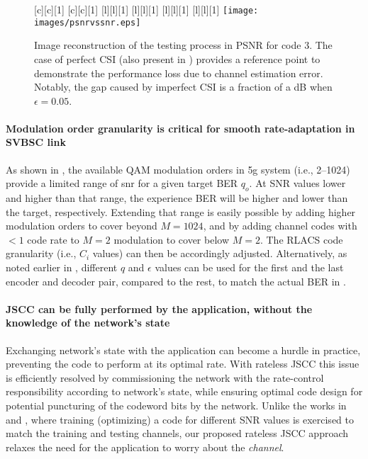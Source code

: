 \begin{figure}[t!]
\begin{center}
[c][c][1]{\scalebox{.8}{image reconstruction PSNR [dB]}}
[c][c][1]{\scalebox{.8}{channel signal to noise ratio [dB]}}
[l][l][1]{\scalebox{\textsizescale}{perfect CSI}}
[l][l][1]{\scalebox{\textsizescale}{imperfect CSI, $\epsilon = 0.01$}}
[l][l][1]{\scalebox{\textsizescale}{imperfect CSI, $\epsilon = 0.05$}}
[l][l][1]{\scalebox{\textsizescale}{imperfect CSI, $\epsilon = 0.1$} }
\texttt{[image: images/psnrvssnr.eps]}
\caption{Image reconstruction of the testing process in PSNR for code 3. The case of perfect CSI (also present in ) provides a reference point to demonstrate the performance loss due to channel estimation error. Notably, the gap caused by imperfect CSI is a fraction of a dB when $\epsilon = 0.05$.}
\label{fig:psnr}
\end{center}
\end{figure}


\paragraph*{Modulation order granularity is critical for smooth rate-adaptation in SVBSC link} As shown in , the available QAM modulation orders in \gls{5g} system (i.e., 2--1024) provide a limited range of \gls{snr} for a given target BER $q_o$. At SNR values lower and higher than that range, the experience BER will be higher and lower than the target, respectively. Extending that range is easily possible by adding higher modulation orders to cover beyond $ M = 1024$, and by adding channel codes with $<1$ code rate to $M=2$ modulation to cover below $M=2$. The RLACS code granularity (i.e., $C_i$ values) can then  be accordingly adjusted. Alternatively, as noted earlier in , different  $q$ and $\epsilon$ values can be used for the first and the last encoder and decoder pair, compared to the rest, to match the actual BER in .


\paragraph*{JSCC can be fully performed by the application, without the knowledge of the network's state} Exchanging network's state with the application can become a hurdle in practice, preventing the code to perform at its optimal rate. With rateless JSCC this issue is efficiently resolved by commissioning the network with the rate-control responsibility according to network's state, while ensuring optimal code design for potential puncturing of the codeword bits by the network. Unlike the works in \cite{bourtsoulatze19_deep_joint_sourc_chann_codin} and \cite{tung2024multilevelreliabilityinterfacesemantic}, where training (optimizing) a code for different SNR values is exercised to match the training and testing channels, our proposed rateless JSCC approach relaxes the need for the application to worry about the \emph{channel}.

